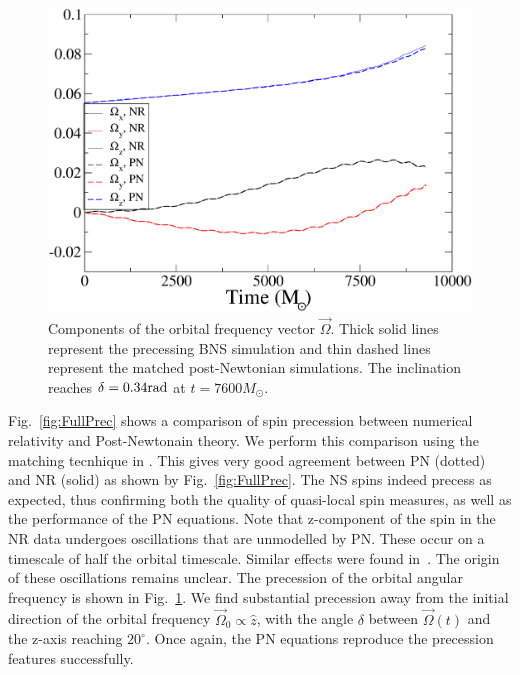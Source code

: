 {%
\begin{figure}
\includegraphics[width=0.95\columnwidth]{chap2/OmegaVectorMatchedUnmatched}
\caption[Components of the orbital frequency vectors during our evolutions.]{\label{fig:OmegaVectorComparison} Components of the orbital
  frequency vector $\vec\Omega$.  Thick solid lines represent the
  precessing BNS simulation and thin
  dashed lines represent the matched  post-Newtonian simulations. The inclination reaches $\delta=0.34 {\rm rad}$ at $t=7600M_{\odot}$.}
\end{figure}


Fig.~\ref{fig:FullPrec} shows a comparison of spin precession
  between numerical relativity and Post-Newtonain theory.  We perform
  this comparison using
  the matching tecnhique in \cite{OssokineEtAl:2014}. This gives very good agreement between PN
  (dotted) and NR (solid) as shown by Fig.~\ref{fig:FullPrec}. The NS spins indeed precess as expected,
  thus confirming both the quality of quasi-local spin measures, as
  well as the performance of the PN equations. Note that z-component of the spin in the NR data undergoes oscillations that are unmodelled by PN. These occur on a timescale of half the orbital timescale. Similar effects were found in~\cite{OssokineEtAl:2014}. The origin of these oscillations remains unclear.   The precession of the
  orbital angular frequency is shown in
  Fig.~\ref{fig:OmegaVectorComparison}.  We find substantial
  precession away from the initial direction of the orbital frequency
  $\vec\Omega_0\propto \hat z$, with the angle $\delta$ between
  $\vec\Omega(t)$ and the z-axis reaching $20^\circ$.  Once again,
  the PN equations reproduce the precession
  features successfully. 

}
